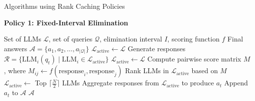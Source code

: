 \documentclass[sigconf,authordraft]{acmart}
\begin{document}
\begin{algorithm}
\caption{Algorithms using Rank Caching Policies}
\label{alg:llm_selection_algorithms}

\vspace{1em}

\textbf{Policy 1: Fixed-Interval Elimination}
\begin{algorithmic}[1]
\Require Set of LLMs $\mathcal{L}$, set of queries $\mathcal{Q}$, elimination interval $I$, scoring function $f$
\Ensure Final answers $\mathcal{A} = \{a_1, a_2, \dots, a_{|\mathcal{Q}|}\}$
\State $\mathcal{L}_{\text{active}} \gets \mathcal{L}$
    \State Generate responses $\mathcal{R} = \{\text{LLM}_i(q_t) \mid \text{LLM}_i \in \mathcal{L}_{\text{active}}\}$
        \State $\mathcal{L}_{\text{active}} \gets \mathcal{L}$
        \State Compute pairwise score matrix $M$
        , where $M_{ij} \gets f(\text{response}_i, \text{response}_j)$
        \State Rank LLMs in $\mathcal{L}_{\text{active}}$ based on $M$
        \State $\mathcal{L}_{\text{active}} \gets$ Top $\lceil \frac{N}{2} \rceil$ LLMs
    \EndIf
    \State Aggregate responses from $\mathcal{L}_{\text{active}}$ to produce $a_t$
    \State Append $a_t$ to $\mathcal{A}$
\EndFor
\Return $\mathcal{A}$
\end{algorithmic}


\end{algorithm}
\end{document}
